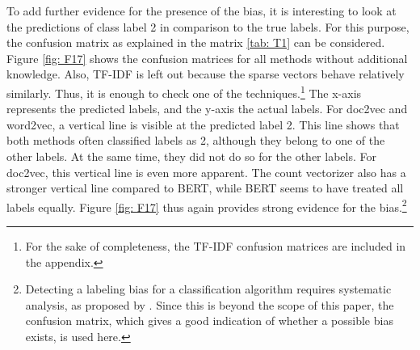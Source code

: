 \documentclass[12pt, a4paper, titlepage]{article}
\begin{document}
To add further evidence for the presence of the bias, it is interesting to look at the predictions of class label 2 in comparison to the true labels. For this purpose, the confusion matrix as explained in the matrix \ref{tab: T1} can be considered. Figure \ref{fig: F17} shows the confusion matrices for all methods without additional knowledge. Also, \ac{TF-IDF} is left out because the sparse vectors behave relatively similarly. Thus, it is enough to check one of the techniques.\footnote{For the sake of completeness, the \ac{TF-IDF} confusion matrices are included in the appendix.} The x-axis represents the predicted labels, and the y-axis the actual labels. For doc2vec and word2vec, a vertical line is visible at the predicted label 2. This line shows that both methods often classified labels as 2, although they belong to one of the other labels. At the same time, they did not do so for the other labels. For doc2vec, this vertical line is even more apparent. The count vectorizer also has a stronger vertical line compared to \ac{BERT}, while \ac{BERT} seems to have treated all labels equally. Figure \ref{fig: F17} thus again provides strong evidence for the bias.\footnote{Detecting a labeling bias for a classification algorithm requires systematic analysis, as proposed by \citet{jiang2020}. Since this is beyond the scope of this paper, the confusion matrix, which gives a good indication of whether a possible bias exists,
is used here.}
\end{document}
